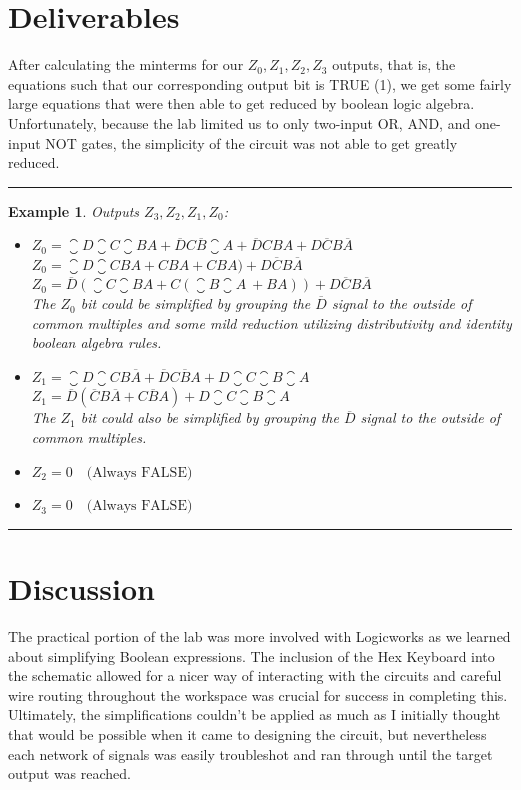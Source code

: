 \documentclass[12pt]{report}
\newtheorem{example}{Example}
\newenvironment{examp}
{\vspace{0.5cm}
\hrule
\begin{example}}
{\hrule
\vspace{0.5cm}
\end{example}}
\begin{document}
\section*{Deliverables}
After calculating the minterms for our \(Z_{0}, Z_{1}, Z_{2}, Z_{3}\) outputs, that is, the equations such that our corresponding output bit is TRUE (1), we get some fairly large equations that were then able to get reduced by boolean logic algebra. Unfortunately, because the lab limited us to only two-input OR, AND, and one-input NOT gates, the simplicity of the circuit was not able to get greatly reduced.
\begin{examp}
	Outputs \( Z_3, Z_2, Z_1, Z_0 \):
	\begin{itemize}
		\item \( Z_0 = \closure{D}\closure{C}\closure{B}A + \overline{D}C\overline{B}\closure{A} + \overline{D}CBA + D\overline{C}B\overline{A} \) \\
		      \( Z_0 = \closure{D}\closure{C}BA + C{B A} + CBA) + D\overline{C}B\overline{A} \) \\
		      \( Z_0 = \overline{D}(\closure{C}\closure{B}A + C(\closure{B}\closure{A}\ + BA)) + D\overline{C}B\overline{A} \) \\
		      The \( Z_0 \) bit could be simplified by grouping the \( \overline{D} \) signal to the outside of common multiples and some mild reduction utilizing distributivity and identity boolean algebra rules.
		\item \( Z_1 = \closure{D}\closure{C}B\overline{A} + \overline{D}C\overline{B}A + D\closure{C}\closure{B}\closure{A}\) \\
		      \( Z_1 = \overline{D}(\overline{C}B\overline{A} + C\overline{B}A) + D\closure{C}\closure{B}\closure{A}\) \\
		      The \( Z_1 \) bit could also be simplified by grouping the \( \overline{D} \) signal to the outside of common multiples. \

		\item \( Z_2 = 0 \quad \text{(Always FALSE)} \)

		\item \( Z_3 = 0 \quad \text{(Always FALSE)} \)
	\end{itemize}
\end{examp}
\section*{Discussion}
The practical portion of the lab was more involved with Logicworks as we learned about simplifying Boolean expressions. The inclusion of the Hex Keyboard into the schematic allowed for a nicer way of interacting with the circuits and careful wire routing throughout the workspace was crucial for success in completing this. Ultimately, the simplifications couldn't be applied as much as I initially thought that would be possible when it came to designing the circuit, but nevertheless each network of signals was easily troubleshot and ran through until the target output was reached.
\end{document}
